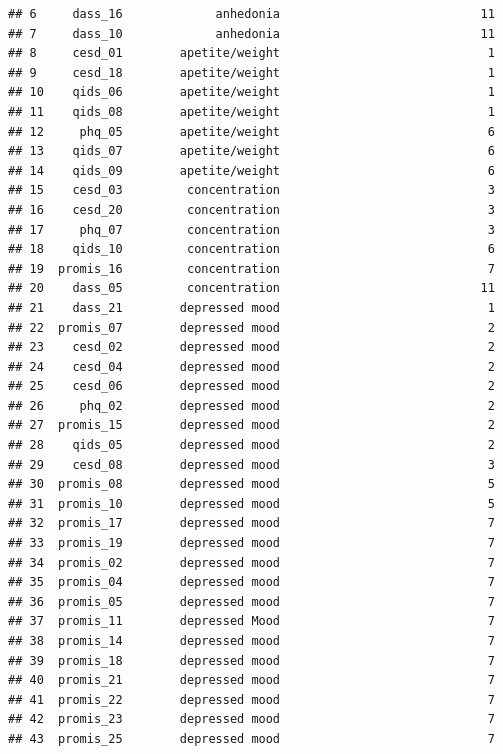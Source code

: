 \documentclass[
]{article}
\begin{document}
\begin{verbatim}
## 6     dass_16             anhedonia                            11
## 7     dass_10             anhedonia                            11
## 8     cesd_01        apetite/weight                             1
## 9     cesd_18        apetite/weight                             1
## 10    qids_06        apetite/weight                             1
## 11    qids_08        apetite/weight                             1
## 12     phq_05        apetite/weight                             6
## 13    qids_07        apetite/weight                             6
## 14    qids_09        apetite/weight                             6
## 15    cesd_03         concentration                             3
## 16    cesd_20         concentration                             3
## 17     phq_07         concentration                             3
## 18    qids_10         concentration                             6
## 19  promis_16         concentration                             7
## 20    dass_05         concentration                            11
## 21    dass_21        depressed mood                             1
## 22  promis_07        depressed mood                             2
## 23    cesd_02        depressed mood                             2
## 24    cesd_04        depressed mood                             2
## 25    cesd_06        depressed mood                             2
## 26     phq_02        depressed mood                             2
## 27  promis_15        depressed mood                             2
## 28    qids_05        depressed mood                             2
## 29    cesd_08        depressed mood                             3
## 30  promis_08        depressed mood                             5
## 31  promis_10        depressed mood                             5
## 32  promis_17        depressed mood                             7
## 33  promis_19        depressed mood                             7
## 34  promis_02        depressed mood                             7
## 35  promis_04        depressed mood                             7
## 36  promis_05        depressed mood                             7
## 37  promis_11        depressed Mood                             7
## 38  promis_14        depressed mood                             7
## 39  promis_18        depressed mood                             7
## 40  promis_21        depressed mood                             7
## 41  promis_22        depressed mood                             7
## 42  promis_23        depressed mood                             7
## 43  promis_25        depressed mood                             7

\end{verbatim}
\end{document}
